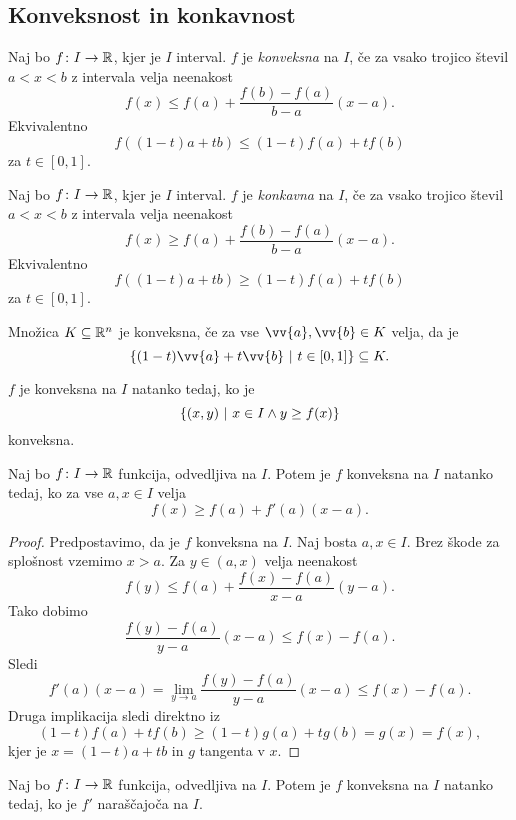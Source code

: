 \documentclass[12pt, a4paper]{article}
\begin{document}
\newpage

\subsection{Konveksnost in konkavnost}

\begin{definicija}
Naj bo $f\colon I\to\mathbb{R}$, kjer je $I$ interval. $f$ je \emph{konveksna} na $I$, če za vsako trojico števil $a<x<b$ z intervala velja neenakost
\[
f(x)\leq f(a)+\frac{f(b)-f(a)}{b-a}(x-a).
\]
Ekvivalentno
\[
f((1-t)a+tb)\leq (1-t)f(a)+tf(b)
\]
za $t\in[0,1]$.
\end{definicija}

\begin{definicija}
Naj bo $f\colon I\to\mathbb{R}$, kjer je $I$ interval. $f$ je \emph{konkavna} na $I$, če za vsako trojico števil $a<x<b$ z intervala velja neenakost
\[
f(x)\geq f(a)+\frac{f(b)-f(a)}{b-a}(x-a).
\]
Ekvivalentno
\[
f((1-t)a+tb)\geq (1-t)f(a)+tf(b)
\]
za $t\in[0,1]$.
\end{definicija}

\begin{opomba}
Množica $K\subseteq \mathbb{R}^n$ je konveksna, če za vse $\vv{a},\vv{b}\in K$ velja, da je
\[
\setb{(1-t)\vv{a}+t\vv{b}}{t\in[0,1]}\subseteq K.
\]
\end{opomba}

\begin{opomba}
$f$ je konveksna na $I$ natanko tedaj, ko je
\[
\left\{(x,y)~\middle\vert~x\in I\land y\geq f(x)\right\}
\]
konveksna.
\end{opomba}

\begin{izrek}
Naj bo $f\colon I\to\mathbb{R}$ funkcija, odvedljiva na $I$. Potem je $f$ konveksna na $I$ natanko tedaj, ko za vse $a,x\in I$ velja
\[
f(x)\geq f(a)+f'(a)(x-a).
\]
\end{izrek}

\begin{proof}
Predpostavimo, da je $f$ konveksna na $I$. Naj bosta $a,x\in I$. Brez škode za splošnost vzemimo $x>a$. Za $y\in (a,x)$ velja neenakost
\[
f(y)\leq f(a)+\frac{f(x)-f(a)}{x-a}(y-a).
\]
Tako dobimo
\[
\frac{f(y)-f(a)}{y-a}(x-a)\leq f(x)-f(a).
\]
Sledi
\[
f'(a)(x-a)=\lim_{y\to a}\frac{f(y)-f(a)}{y-a}(x-a)\leq f(x)-f(a).
\]
Druga implikacija sledi direktno iz
\[
(1-t)f(a)+tf(b)\geq (1-t)g(a)+tg(b)=g(x)=f(x),
\]
kjer je $x=(1-t)a+tb$ in $g$ tangenta v $x$.
\end{proof}

\begin{izrek}
Naj bo $f\colon I\to\mathbb{R}$ funkcija, odvedljiva na $I$. Potem je $f$ konveksna na $I$ natanko tedaj, ko je $f'$ naraščajoča na $I$.
\end{izrek}
\end{document}
